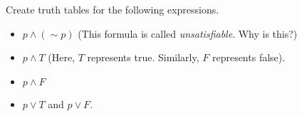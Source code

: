 Create truth tables for the following expressions.

\begin{itemize}
    \item $p \land (\sim p)$ (This formula is called \textit{unsatisfiable}. Why is this?)
    \item $p \land T$ (Here, $T$ represents true. Similarly, $F$ represents false).
    \item $p \land F$
    \item $p \lor T$ and $p \lor F$.
\end{itemize}

